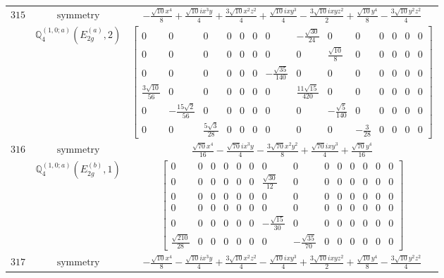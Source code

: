 \documentclass[fleqn,8pt,landscape]{jsarticle}
\begin{document}
\begin{longtable}{ccc}
$ 315 $ & $ \text{symmetry} $ & $ - \frac{\sqrt{10} x^{4}}{8} + \frac{\sqrt{10} i x^{3} y}{4} + \frac{3 \sqrt{10} x^{2} z^{2}}{4} + \frac{\sqrt{10} i x y^{3}}{4} - \frac{3 \sqrt{10} i x y z^{2}}{2} + \frac{\sqrt{10} y^{4}}{8} - \frac{3 \sqrt{10} y^{2} z^{2}}{4} $ \\
$  $ & $ \mathbb{Q}_{4}^{(1,0;a)}(E_{2g}^{(a)},2) $ & $ \begin{bmatrix} 0 & 0 & 0 & 0 & 0 & 0 & 0 & - \frac{\sqrt{30}}{24} & 0 & 0 & 0 & 0 & 0 & 0 \\ 0 & 0 & 0 & 0 & 0 & 0 & 0 & 0 & \frac{\sqrt{10}}{8} & 0 & 0 & 0 & 0 & 0 \\ 0 & 0 & 0 & 0 & 0 & 0 & - \frac{\sqrt{35}}{140} & 0 & 0 & 0 & 0 & 0 & 0 & 0 \\ \frac{3 \sqrt{10}}{56} & 0 & 0 & 0 & 0 & 0 & 0 & \frac{11 \sqrt{15}}{420} & 0 & 0 & 0 & 0 & 0 & 0 \\ 0 & - \frac{15 \sqrt{2}}{56} & 0 & 0 & 0 & 0 & 0 & 0 & - \frac{\sqrt{5}}{140} & 0 & 0 & 0 & 0 & 0 \\ 0 & 0 & \frac{5 \sqrt{3}}{28} & 0 & 0 & 0 & 0 & 0 & 0 & - \frac{3}{28} & 0 & 0 & 0 & 0 \end{bmatrix} $ \\ \hline
$ 316 $ & $ \text{symmetry} $ & $ \frac{\sqrt{70} x^{4}}{16} - \frac{\sqrt{70} i x^{3} y}{4} - \frac{3 \sqrt{70} x^{2} y^{2}}{8} + \frac{\sqrt{70} i x y^{3}}{4} + \frac{\sqrt{70} y^{4}}{16} $ \\
$  $ & $ \mathbb{Q}_{4}^{(1,0;a)}(E_{2g}^{(b)},1) $ & $ \begin{bmatrix} 0 & 0 & 0 & 0 & 0 & 0 & 0 & 0 & 0 & 0 & 0 & 0 & 0 & 0 \\ 0 & 0 & 0 & 0 & 0 & 0 & \frac{\sqrt{30}}{12} & 0 & 0 & 0 & 0 & 0 & 0 & 0 \\ 0 & 0 & 0 & 0 & 0 & 0 & 0 & 0 & 0 & 0 & 0 & 0 & 0 & 0 \\ 0 & 0 & 0 & 0 & 0 & 0 & 0 & 0 & 0 & 0 & 0 & 0 & 0 & 0 \\ 0 & 0 & 0 & 0 & 0 & 0 & - \frac{\sqrt{15}}{30} & 0 & 0 & 0 & 0 & 0 & 0 & 0 \\ \frac{\sqrt{210}}{28} & 0 & 0 & 0 & 0 & 0 & 0 & - \frac{\sqrt{35}}{70} & 0 & 0 & 0 & 0 & 0 & 0 \end{bmatrix} $ \\ \hline
$ 317 $ & $ \text{symmetry} $ & $ - \frac{\sqrt{10} x^{4}}{8} - \frac{\sqrt{10} i x^{3} y}{4} + \frac{3 \sqrt{10} x^{2} z^{2}}{4} - \frac{\sqrt{10} i x y^{3}}{4} + \frac{3 \sqrt{10} i x y z^{2}}{2} + \frac{\sqrt{10} y^{4}}{8} - \frac{3 \sqrt{10} y^{2} z^{2}}{4} $ \\

\end{longtable}
\end{document}
